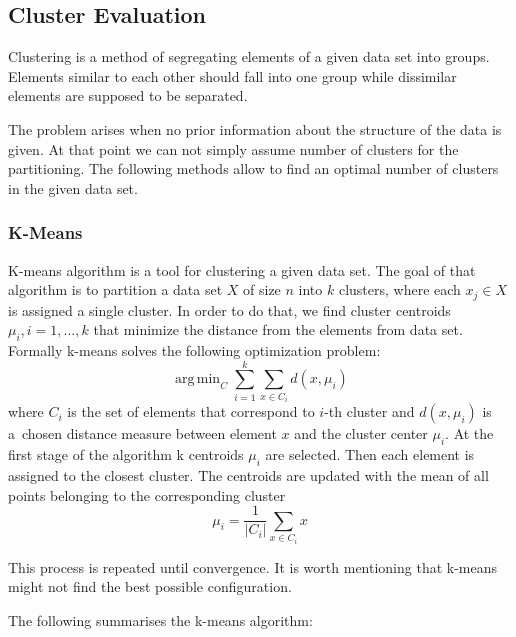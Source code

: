 \documentclass{article}
\DeclareMathOperator*{\argmin}{arg\,min} %
\begin{document}
\subsection{Cluster Evaluation} \label{sec::cluster}

Clustering is a method of segregating elements of a given data set into groups. Elements similar to each other should fall into one group while dissimilar elements are supposed to be separated.

The problem arises when no prior information about the structure of the data is given. At that point we can not simply assume number of clusters for the partitioning. The following methods allow to find an optimal number of clusters in the given data set.

\subsubsection{K-Means}

K-means algorithm is a tool for clustering a given data set.
The goal of that algorithm is to partition a data set $X$ of size $n$ into $k$ clusters, where each $x_{j}\in X$ is assigned a single cluster. In order to do that, we find cluster centroids $\mu_{i}, i=1,\ldots,k$ that minimize the distance from the elements from data set. Formally k-means solves the following optimization problem:
\begin{equation}
  \argmin_{C}\sum_{i=1}^{k}\sum_{x\in C_{i}} d(x,\mu_{i})
\end{equation}
where $C_{i}$ is the set of elements that correspond to $i$-th cluster and $d(x,\mu_{i})$ is a~chosen distance measure between element $x$ and the cluster center $\mu_{i}$. At the first stage of the algorithm k centroids $\mu_{i}$ are selected. Then each element is assigned to the closest cluster. The centroids are updated with the mean of all points belonging to the corresponding cluster
\begin{equation}
  \mu_{i} = \frac{1}{|C_{i}|} \sum_{x\in C_{i}} x
\end{equation}

This process is repeated until convergence. It is worth mentioning that k-means might not find the best possible 
configuration.

The following summarises the k-means algorithm:
\end{document}
